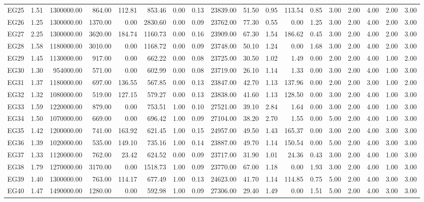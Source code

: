 \begin{tabular}{lrrrrrrrrrrrrrrrrr}
EG25 & 1.51 & 1300000.00 & 864.00 & 112.81 & 853.46 & 0.00 & 0.13 & 23839.00 & 51.50 & 0.95 & 113.54 & 0.85 & 3.00 & 2.00 & 4.00 & 2.00 & 3.00 \\
EG26 & 1.25 & 1300000.00 & 1370.00 & 0.00 & 2830.60 & 0.00 & 0.09 & 23762.00 & 77.30 & 0.55 & 0.00 & 1.25 & 3.00 & 2.00 & 4.00 & 2.00 & 3.00 \\
EG27 & 2.25 & 1300000.00 & 3620.00 & 184.74 & 1160.73 & 0.00 & 0.16 & 23909.00 & 67.30 & 1.54 & 186.62 & 0.45 & 3.00 & 2.00 & 4.00 & 2.00 & 3.00 \\
EG28 & 1.58 & 1180000.00 & 3010.00 & 0.00 & 1168.72 & 0.00 & 0.09 & 23748.00 & 50.10 & 1.24 & 0.00 & 1.68 & 3.00 & 2.00 & 4.00 & 2.00 & 3.00 \\
EG29 & 1.45 & 1130000.00 & 917.00 & 0.00 & 662.22 & 0.00 & 0.08 & 23725.00 & 30.50 & 1.02 & 1.49 & 0.00 & 2.00 & 2.00 & 4.00 & 1.00 & 2.00 \\
EG30 & 1.30 & 954000.00 & 571.00 & 0.00 & 602.99 & 0.00 & 0.08 & 23719.00 & 26.10 & 1.14 & 1.33 & 0.00 & 3.00 & 2.00 & 4.00 & 1.00 & 3.00 \\
EG31 & 1.37 & 1180000.00 & 697.00 & 136.55 & 567.85 & 0.00 & 0.13 & 23847.00 & 42.70 & 1.13 & 137.96 & 0.00 & 2.00 & 2.00 & 3.00 & 1.00 & 2.00 \\
EG32 & 1.32 & 1080000.00 & 519.00 & 127.15 & 579.27 & 0.00 & 0.13 & 23838.00 & 41.60 & 1.13 & 128.50 & 0.00 & 3.00 & 2.00 & 4.00 & 1.00 & 3.00 \\
EG33 & 1.59 & 1220000.00 & 879.00 & 0.00 & 753.51 & 1.00 & 0.10 & 27521.00 & 39.10 & 2.84 & 1.64 & 0.00 & 3.00 & 2.00 & 4.00 & 1.00 & 3.00 \\
EG34 & 1.50 & 1070000.00 & 669.00 & 0.00 & 696.42 & 1.00 & 0.09 & 27104.00 & 38.20 & 2.70 & 1.55 & 0.00 & 5.00 & 2.00 & 4.00 & 1.00 & 3.00 \\
EG35 & 1.42 & 1200000.00 & 741.00 & 163.92 & 621.45 & 1.00 & 0.15 & 24957.00 & 49.50 & 1.43 & 165.37 & 0.00 & 3.00 & 2.00 & 4.00 & 3.00 & 3.00 \\
EG36 & 1.39 & 1020000.00 & 535.00 & 149.10 & 735.16 & 1.00 & 0.14 & 23887.00 & 49.70 & 1.14 & 150.54 & 0.00 & 5.00 & 2.00 & 4.00 & 3.00 & 3.00 \\
EG37 & 1.33 & 1120000.00 & 762.00 & 23.42 & 624.52 & 0.00 & 0.09 & 23717.00 & 31.90 & 1.01 & 24.36 & 0.43 & 3.00 & 2.00 & 4.00 & 1.00 & 3.00 \\
EG38 & 1.79 & 1270000.00 & 3170.00 & 0.00 & 1518.73 & 1.00 & 0.09 & 23770.00 & 67.00 & 1.18 & 0.00 & 1.93 & 3.00 & 2.00 & 4.00 & 1.00 & 3.00 \\
EG39 & 1.40 & 1300000.00 & 763.00 & 114.17 & 677.49 & 1.00 & 0.13 & 24623.00 & 41.70 & 1.14 & 114.85 & 0.75 & 5.00 & 2.00 & 4.00 & 3.00 & 3.00 \\
EG40 & 1.47 & 1490000.00 & 1280.00 & 0.00 & 592.98 & 1.00 & 0.09 & 27306.00 & 29.40 & 1.49 & 0.00 & 1.51 & 5.00 & 2.00 & 4.00 & 3.00 & 3.00 \\
\bottomrule
\end{tabular}
